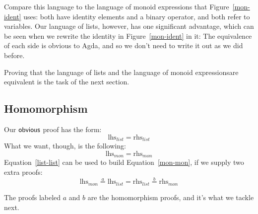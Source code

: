 \documentclass[draft, twocolumn]{article}
\theoremstyle{definition}
\begin{document}
Compare this language to the language of monoid expressions that
Figure~\ref{mon-ident} uses: both have identity elements and a binary operator,
and both refer to variables. Our language of lists, however, has one significant
advantage, which can be seen when we rewrite the identity in
Figure~\ref{mon-ident} in it:
The equivalence of each side is obvious to Agda, and so we don't need to write
it out as we did before.

Proving that the language of lists and the language of monoid
expressions\footnotemark are equivalent is the task of the next section.
\subsection{Homomorphism}
Our \(\AgdaFunction{\text{obvious}}\) proof has the form:
\begin{equation}
  \label{list-list}
  \text{lhs}_{list} = \text{rhs}_{list}
\end{equation}
What we want, though, is the following:
\begin{equation}
  \label{mon-mon}
  \text{lhs}_{mon} = \text{rhs}_{mon}
\end{equation}
Equation~\ref{list-list} can be used to build Equation~\ref{mon-mon}, if we
supply two extra proofs:
\begin{equation}
  \label{mon-list-mon}
  \text{lhs}_{mon} \overset{a}{=} \text{lhs}_{list} = \text{rhs}_{list}
  \overset{b}{=} \text{rhs}_{mon}
\end{equation}

The proofs labeled \(a\) and \(b\) are the homomorphism proofs, and it's what we
tackle next.
\end{document}
